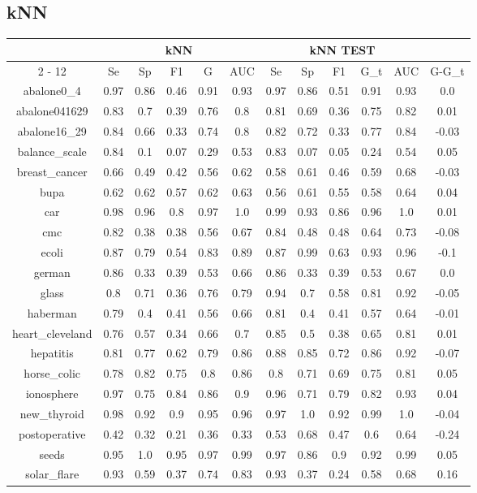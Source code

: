 \documentclass{article}%
\begin{document}
%
\subsection*{kNN}%
\begin{tabular}{|c|c|c|c|c|c|c|c|c|c|c|c|}%
\hline%
&\multicolumn{5}{|c|}{kNN}&\multicolumn{5}{|c|}{kNN TEST}&\\%
\cline{2%
-%
12}%
&Se&Sp&F1&G&AUC&Se&Sp&F1&G\_t&AUC&G{-}G\_t\\%
\hline%
abalone0\_4&0.97&0.86&0.46&0.91&0.93&0.97&0.86&0.51&0.91&0.93&0.0\\%
abalone041629&0.83&0.7&0.39&0.76&0.8&0.81&0.69&0.36&0.75&0.82&0.01\\%
abalone16\_29&0.84&0.66&0.33&0.74&0.8&0.82&0.72&0.33&0.77&0.84&{-}0.03\\%
balance\_scale&0.84&0.1&0.07&0.29&0.53&0.83&0.07&0.05&0.24&0.54&0.05\\%
breast\_cancer&0.66&0.49&0.42&0.56&0.62&0.58&0.61&0.46&0.59&0.68&{-}0.03\\%
bupa&0.62&0.62&0.57&0.62&0.63&0.56&0.61&0.55&0.58&0.64&0.04\\%
car&0.98&0.96&0.8&0.97&1.0&0.99&0.93&0.86&0.96&1.0&0.01\\%
cmc&0.82&0.38&0.38&0.56&0.67&0.84&0.48&0.48&0.64&0.73&{-}0.08\\%
ecoli&0.87&0.79&0.54&0.83&0.89&0.87&0.99&0.63&0.93&0.96&{-}0.1\\%
german&0.86&0.33&0.39&0.53&0.66&0.86&0.33&0.39&0.53&0.67&0.0\\%
glass&0.8&0.71&0.36&0.76&0.79&0.94&0.7&0.58&0.81&0.92&{-}0.05\\%
haberman&0.79&0.4&0.41&0.56&0.66&0.81&0.4&0.41&0.57&0.64&{-}0.01\\%
heart\_cleveland&0.76&0.57&0.34&0.66&0.7&0.85&0.5&0.38&0.65&0.81&0.01\\%
hepatitis&0.81&0.77&0.62&0.79&0.86&0.88&0.85&0.72&0.86&0.92&{-}0.07\\%
horse\_colic&0.78&0.82&0.75&0.8&0.86&0.8&0.71&0.69&0.75&0.81&0.05\\%
ionosphere&0.97&0.75&0.84&0.86&0.9&0.96&0.71&0.79&0.82&0.93&0.04\\%
new\_thyroid&0.98&0.92&0.9&0.95&0.96&0.97&1.0&0.92&0.99&1.0&{-}0.04\\%
postoperative&0.42&0.32&0.21&0.36&0.33&0.53&0.68&0.47&0.6&0.64&{-}0.24\\%
seeds&0.95&1.0&0.95&0.97&0.99&0.97&0.86&0.9&0.92&0.99&0.05\\%
solar\_flare&0.93&0.59&0.37&0.74&0.83&0.93&0.37&0.24&0.58&0.68&0.16\\%

\end{tabular}
\end{document}
